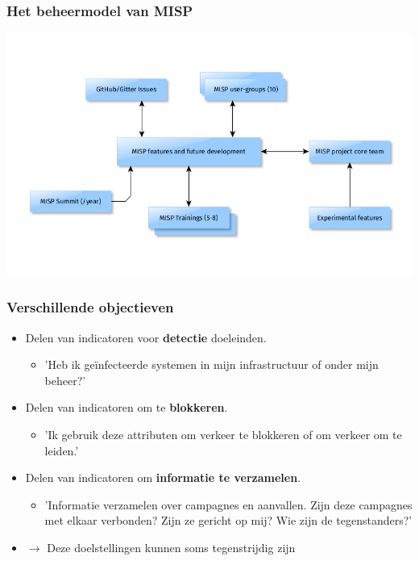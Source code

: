 \begin{frame}
\frametitle{Het beheermodel van MISP}
\includegraphics[scale=0.4]{governance.png}
\end{frame}

\begin{frame}
\frametitle{Verschillende objectieven}
        \begin{itemize}
                \item Delen van indicatoren voor {\bf detectie} doeleinden.
                        \begin{itemize}
                                \item 'Heb ik geïnfecteerde systemen in mijn infrastructuur of onder mijn beheer?'
                        \end{itemize}
                \item Delen van  indicatoren om te {\bf blokkeren}.
                        \begin{itemize}
                                \item 'Ik gebruik deze attributen om verkeer te blokkeren of om verkeer om te leiden.'
                        \end{itemize}
                \item Delen van  indicatoren om {\bf informatie te verzamelen}.
                        \begin{itemize}
                                \item 'Informatie verzamelen over campagnes en aanvallen. Zijn deze campagnes met elkaar verbonden? Zijn ze gericht op mij? Wie zijn de tegenstanders?'
                        \end{itemize}
                \item $\rightarrow$ Deze doelstellingen kunnen soms tegenstrijdig zijn
        \end{itemize}
\end{frame}

